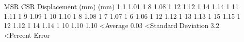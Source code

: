 MSR	CSR	Displacement (mm)	
(mm)
1	1	1.01	
1	8	1.08	
1	12	1.12	
1	14	1.14	
1	11	1.11	
1	9	1.09	
1	10	1.10	
1	8	1.08	
1	7	1.07	
1	6	1.06	
1	12	1.12	
1	13	1.13	
1	15	1.15	
1	12	1.12	
1	14	1.14	
1	10	1.10	
		1.10	<Average
		0.03	<Standard Deviation
		3.2	<Percent Error
